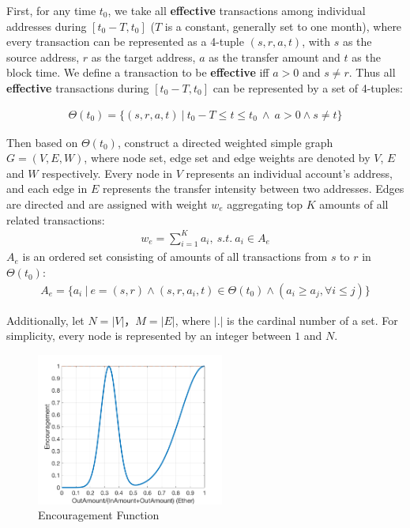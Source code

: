 First, for any time $t_0$, we take all \textbf{effective} transactions among individual addresses during $[t_0- T, t_0]$ ($T$ is a constant, generally set to one month), where every transaction can be represented as a 4-tuple $(s,r,a,t)$, with $s$ as the source address, $r$ as the target address, $a$ as the transfer amount and $t$ as the block time. We define a transaction to be \textbf{effective} iff $a>0$ and $s \neq r	$. Thus all \textbf{effective} transactions during $[t_0- T, t_0]$ can be represented by a set of 4-tuples:

\begin{align}
\Theta(t_0) = \{(s, r, a, t)\ |\ t_0 - T \le t \le t_0\ \land \ a > 0 \land s \neq t \}	
\end{align}

Then based on $\Theta(t_0)$, construct a directed weighted simple graph $G=(V,E, W)$, where node set, edge set and edge weights are denoted by $V$, $E$ and $W$ respectively. Every node in $V$ represents an individual account's address, and each edge in $E$ represents the transfer intensity between two addresses. Edges are directed and are assigned with weight $w_e$ aggregating top $K$ amounts of all related transactions:
\begin{align}\label{formula:edgeweight}
w_e = \sum_{i=1}^K a_i,\ s.t.\ a_i \in A_e
\end{align}
$A_e$ is an ordered set consisting of amounts of all transactions from $s$ to $r$ in $\Theta(t_0)$:
\begin{align}
A_e = \{a_i\ |\ e = (s,r) \land (s, r, a_i, t) \in \Theta(t_0) \land (a_i \ge a_j, \forall i \le j) \}
\end{align}

Additionally, let $N = |V|$，$M = |E|$, where $|.|$ is the cardinal number of a set. For simplicity, every node is represented by an integer between $1$ and $N$.

\begin{figure}[h]
\centering
	\includegraphics[width=0.55\textwidth]{figs/encouragement_en.png}
	\caption{Encouragement Function}\label{fig:encouragement}
\end{figure}

